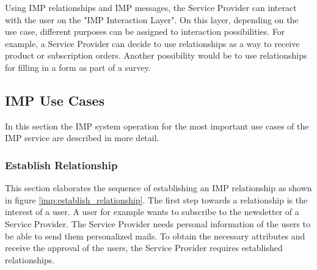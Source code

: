 Using IMP relationships and IMP messages, the Service Provider can interact with the user on the "IMP Interaction Layer". On this layer, depending on the use case, different purposes can be assigned to interaction possibilities. For example, a Service Provider can decide to use relationships as a way to receive product or subscription orders. Another possibility would be to use relationships for filling in a form as part of a survey.

\subsection{IMP Use Cases}

In this section the IMP system operation for the most important use cases of the IMP service are described in more detail.

\subsubsection{Establish Relationship}

This section elaborates the sequence of establishing an IMP relationship as shown in figure \ref{imp:establish_relationship}.
The first step towards a relationship is the interest of a user. A user for example wants to subscribe to the newsletter of a Service Provider. The Service Provider needs personal information of the users to be able to send them personalized mails. To obtain the necessary attributes and receive the approval of the users, the Service Provider requires  established relationships.

